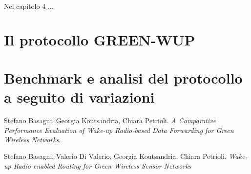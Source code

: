 \documentclass[binding=0.6cm,TFA]{sapthesis}
\begin{document}
Nel capitolo 4 ...\\


\chapter{Il protocollo GREEN-WUP}
\chapter{Benchmark e analisi del protocollo a seguito di variazioni}

\backmatter
\cleardoublepage
{} %

\begin{thebibliography}{9}

    Stefano Basagni, Georgia Koutsandria, Chiara Petrioli.
    \textit{A Comparative Performance Evaluation of Wake-up Radio-based Data Forwarding for Green Wireless Networks}.

    Stefano Basagni, Valerio Di Valerio, Georgia Koutsandria, Chiara Petrioli.
    \textit{Wake-up Radio-enabled Routing for Green Wireless Sensor Networks}
\end{thebibliography}
\end{document}
